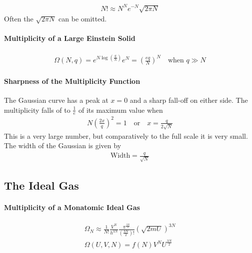 \documentclass[10pt]{article}
\begin{document}
\begin{align}
  N!\approx N^Ne^{-N}\sqrt{2\pi N}
\end{align}
Often the $\sqrt{2\pi N}$ can be omitted.

\paragraph{Multiplicity of a Large Einstein Solid}%
\label{par:multiplicity_of_a_large_einstein_solid}

\begin{align}
  \Omega(N,q)=e^{N\log\left(\frac{q}{N}\right)}e^N=\left(\frac{eq}{N}\right)^N\quad\text{when
  $q\gg N$}
\end{align}

\paragraph{Sharpness of the Multiplicity Function}%
\label{par:sharpness_of_the_multiplicity_function}

The Gaussian curve has a peak at $x=0$ and a sharp fall-off on either side. The
multiplicity falls of to $\frac{1}{e}$ of its maximum value when
\begin{align}
  N\left(\frac{2x}{q}\right)^2=1\quad\text{or}\quad x=\frac{q}{2\sqrt{N}}
\end{align}
This is a very large number, but comparatively to the full scale it is very
small. The width of the Gaussian is given by
\begin{align}
  \text{Width} = \frac{q}{\sqrt{N}}
\end{align}

\subsection{The Ideal Gas}%
\label{sub:the_ideal_gas}

\paragraph{Multiplicity of a Monatomic Ideal Gas}%
\label{par:multiplicity_of_a_monatomic_ideal_gas}

\begin{align}
  \Omega_N\approx
  \frac{1}{N!}\frac{V^N}{h^{3N}}\frac{\pi^{\frac{3N}{2}}}{\left(\frac{3N}{2}\right)!}\left(\sqrt{2mU}\right)^{3N}\\
  \Omega(U,V,N)=f(N)V^NU^{\frac{3N}{2}}
\end{align}
\end{document}
